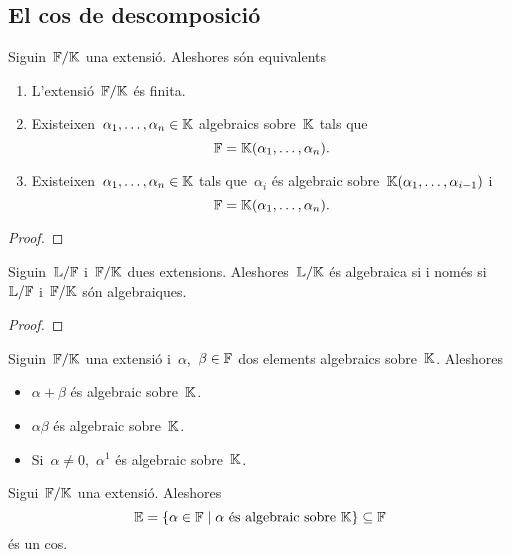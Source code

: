 \documentclass[../../Main.tex]{subfiles}
\begin{document}
\subsection{El cos de descomposició}
	\begin{lemma}
		\label{lema:condicions equivalents a extensió finita}
		Siguin~\(\mathbb{F}/\mathbb{K}\) una extensió. Aleshores són equivalents
		\begin{enumerate}
		\item L'extensió~\(\mathbb{F}/\mathbb{K}\) és finita.
		\item Existeixen~\(\alpha_{1},\dots,\alpha_{n}\in\mathbb{K}\) algebraics sobre~\(\mathbb{K}\) tals que
		\[
		    \mathbb{F}=\mathbb{K}(\alpha_{1},\dots,\alpha_{n}).
		\]
		\item Existeixen~\(\alpha_{1},\dots,\alpha_{n}\in\mathbb{K}\) tals que~\(\alpha_{i}\) és algebraic sobre~\(\mathbb{K}(\alpha_{1},\dots,\alpha_{i-1})\) i
		\[
		    \mathbb{F}=\mathbb{K}(\alpha_{1},\dots,\alpha_{n}).
		\]
		\end{enumerate}
		\begin{proof}
		\end{proof}
	\end{lemma}
	\begin{theorem}
		\label{thm:teorema de les extensions algebraiques}
		Siguin~\(\mathbb{L}/\mathbb{F}\) i~\(\mathbb{F}/\mathbb{K}\) dues extensions. Aleshores~\(\mathbb{L}/\mathbb{K}\) és algebraica
		si i només si~\(\mathbb{L}/\mathbb{F}\) i~\(\mathbb{F}/\mathbb{K}\) són algebraiques.
		\begin{proof}
		\end{proof}
	\end{theorem}
	\begin{theorem}
		\label{thm:els nombres algebraics són un cos}
		Siguin~\(\mathbb{F}/\mathbb{K}\) una extensió i~\(\alpha\),~\(\beta\in\mathbb{F}\) dos elements algebraics sobre~\(\mathbb{K}\). Aleshores
		\begin{itemize}
		\item \(\alpha+\beta\) és algebraic sobre~\(\mathbb{K}\).
		\item \(\alpha\beta\) és algebraic sobre~\(\mathbb{K}\).
		\item Si~\(\alpha\neq0\),~\(\alpha^{1}\) és algebraic sobre~\(\mathbb{K}\).
		\end{itemize}
	\end{theorem}
	\begin{corollary}
		\label{cor:els nombres algebraics són un cos}
		Sigui~\(\mathbb{F}/\mathbb{K}\) una extensió. Aleshores
		\[
		    \mathbb{E}=\{\alpha\in\mathbb{F}\mid\alpha\text{ és algebraic sobre }\mathbb{K}\}\subseteq\mathbb{F}
		\]
		és un cos.
	\end{corollary}
\end{document}
